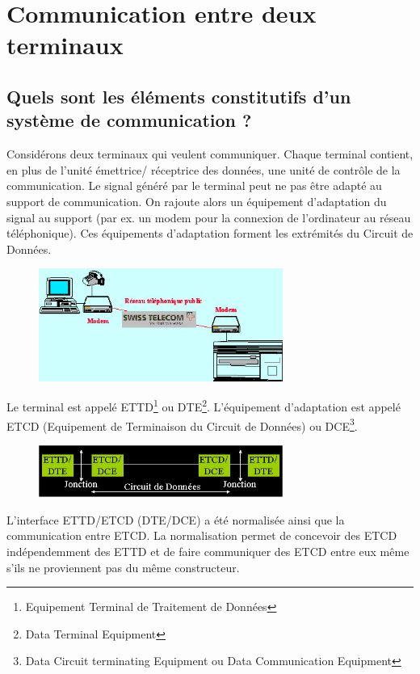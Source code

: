 \chapter{Communication entre deux terminaux}
\section{Quels sont les éléments constitutifs d'un système de communication ?}
Considérons deux terminaux qui veulent communiquer. Chaque terminal contient, en plus de
l'unité émettrice/ réceptrice des données, une unité de contrôle de la communication. Le
signal généré par le terminal peut ne pas être adapté au support de communication. On rajoute
alors un équipement d'adaptation du signal au support (par ex. un modem pour la connexion de
l'ordinateur au réseau téléphonique). Ces équipements d'adaptation forment les extrémités du
Circuit de Données.

\begin{figure}[H]
	\centering
	\includegraphics[width=8cm]{partie2/transmodem.jpg}
\end{figure}

Le terminal est appelé ETTD\footnote{Equipement Terminal de Traitement de Données} ou
DTE\footnote{Data
Terminal Equipment}. L'équipement d'adaptation est appelé ETCD (Equipement de Terminaison du
Circuit de Données) ou DCE\footnote{Data Circuit terminating Equipment ou Data Communication
Equipment}.
\begin{figure}[H]
	\centering
	\includegraphics[width=8cm]{partie2/ettdetcd.jpg}
\end{figure}
L'interface ETTD/ETCD (DTE/DCE) a été normalisée ainsi que la communication entre ETCD. La
normalisation permet de concevoir des ETCD indépendemment des ETTD et de faire communiquer des
ETCD entre eux même s'ils ne proviennent pas du même constructeur.


